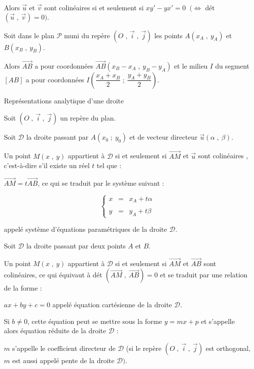 \documentclass{article}
\begin{document}
		Alors $\vec{u}$ et $\vec{v}$ sont colinéaires si et seulement si $xy'-yx'=0$ $\ (\Leftrightarrow$ dét$(\vec{u}\;,\ \vec{v})=0).$
		
		Soit dans le plan $\mathcal{P}$ muni du repère $(O\;,\ \vec{i}\;,\ \vec{j})$ les points $A\left(x_{A}\;,\ y_{A}\right)$ et $B\left(x_{B}\;,\ y_{B}\right).$
		
		Alors $\overrightarrow{AB}$ a pour coordonnées $\overrightarrow{AB}\left(x_{B}-x_{A}\;,\ y_{B}-y_{A}\right)$ et le milieu $I$ du segment $[AB]$ a pour coordonnées $I\left(\dfrac{x_{A}+x_{B}}{2}\;;\ \dfrac{y_{A}+y_{B}}{2}\right).$
		
		Représentations analytique d'une droite
		
		Soit $(O\;,\ \vec{i}\;,\ \vec{j})$ un repère du plan.
		
		Soit $\mathcal{D}$ la droite passant par $A(x_{0}\;;\ y_{0})$ et de vecteur directeur $\overrightarrow{u}(\alpha\;,\ \beta).$
		
		Un point $M(x\;,\ y)$ appartient à $\mathcal{D}$ si et seulement si $\overrightarrow{AM}$ et $\overrightarrow{u}$ sont colinéaires , c'est-à-dire s'il existe un réel $t$ tel que : 
		
		$\overrightarrow{AM}=t\overrightarrow{AB}$, ce qui se traduit par le système suivant :
		
		$$\left\lbrace\begin{array}{lcl} x& =& x_{A}+t\alpha\\ \\ y& =& y_{A}+t\beta \end{array}\right.$$
		
		appelé système d'équations paramétriques de la droite $\mathcal{D}.$
		
		Soit $\mathcal{D}$ la droite passant par deux points $A$ et $B.$ 
		
		Un point $M(x\;,\ y)$ appartient à $\mathcal{D}$ si et seulement si $\overrightarrow{AM}$ et $\overrightarrow{AB}$ sont colinéaires, ce qui équivaut à dét $ \left(\overrightarrow{AM}\;,\ \overrightarrow{AB}\right)=0$ et se traduit par une relation de la forme : 
		
		$ax+by+c=0$ appelé équation cartésienne de la droite $\mathcal{D}.$
		
		Si $b\neq 0$, cette équation peut se mettre sous la forme $y=mx+p$ et s'appelle alors équation réduite de la droite $\mathcal{D}$ : 
		
		$m$ s'appelle le coefficient directeur de $\mathcal{D}$ (si le repère $(O\;,\ \vec{i}\;,\ \vec{j})$ est orthogonal, $m$ est aussi appelé pente de la droite $\mathcal{D}).$ 
		
\end{document}

